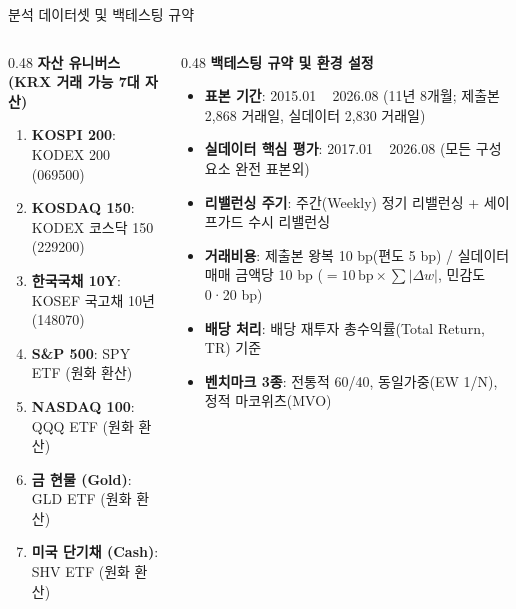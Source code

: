 \begin{frame}{분석 데이터셋 및 백테스팅 규약}
\begin{columns}[T]
  \begin{column}{0.48\textwidth}
    \textbf{자산 유니버스 (KRX 거래 가능 7대 자산)}
    \begin{enumerate}
      \setlength{\itemsep}{3pt}
      \small
      \item \textbf{KOSPI 200}: KODEX 200 (069500)
      \item \textbf{KOSDAQ 150}: KODEX 코스닥 150 (229200)
      \item \textbf{한국국채 10Y}: KOSEF 국고채 10년 (148070)
      \item \textbf{S\&P 500}: SPY ETF (원화 환산)
      \item \textbf{NASDAQ 100}: QQQ ETF (원화 환산)
      \item \textbf{금 현물 (Gold)}: GLD ETF (원화 환산)
      \item \textbf{미국 단기채 (Cash)}: SHV ETF (원화 환산)
    \end{enumerate}
  \end{column}
  
  \begin{column}{0.48\textwidth}
    \textbf{백테스팅 규약 및 환경 설정}
    \begin{itemize}
      \setlength{\itemsep}{4pt}
      \small
      \item \textbf{표본 기간}: 2015.01 ~ 2026.08 (11년 8개월; 제출본 2,868 거래일, 실데이터 2,830 거래일)
      \item \textbf{실데이터 핵심 평가}: 2017.01 ~ 2026.08 (모든 구성요소 완전 표본외)
      \item \textbf{리밸런싱 주기}: 주간(Weekly) 정기 리밸런싱 + 세이프가드 수시 리밸런싱
      \item \textbf{거래비용}: 제출본 왕복 10 bp(편도 5 bp) / 실데이터 매매 금액당 10 bp ($= 10\,\mathrm{bp}\times\sum|\Delta w|$, 민감도 0·20 bp)
      \item \textbf{배당 처리}: 배당 재투자 총수익률(Total Return, TR) 기준
      \item \textbf{벤치마크 3종}: 전통적 60/40, 동일가중(EW 1/N), 정적 마코위츠(MVO)
    \end{itemize}
  \end{column}
\end{columns}
\end{frame}
